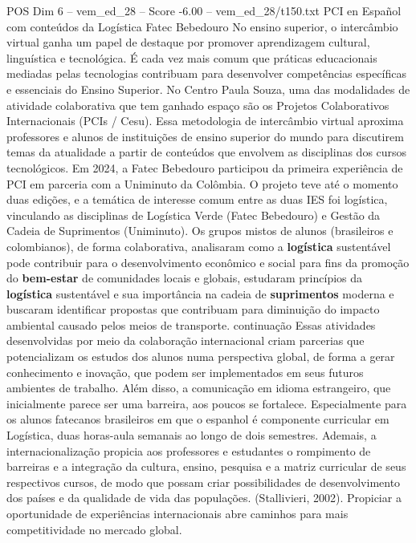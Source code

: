 \begin{textsample}{POS Dim 6 – vem\_ed\_28 – Score -6.00 – vem\_ed\_28/t150.txt}  \label{ex:f6_pos_027}
PCI en Español com conteúdos da Logística Fatec Bebedouro No ensino superior, o intercâmbio virtual ganha um papel de destaque por promover aprendizagem cultural, linguística e tecnológica.
É cada vez mais comum que práticas educacionais mediadas pelas tecnologias contribuam para desenvolver competências específicas e essenciais do Ensino Superior.
No Centro Paula Souza, uma das modalidades de atividade colaborativa que tem ganhado espaço são os Projetos Colaborativos Internacionais (PCIs / Cesu).
Essa metodologia de intercâmbio virtual aproxima professores e alunos de instituições de ensino superior do mundo para discutirem temas da atualidade a partir de conteúdos que envolvem as disciplinas dos cursos tecnológicos.
Em 2024, a Fatec Bebedouro participou da primeira experiência de PCI em parceria com a Uniminuto da Colômbia.
O projeto teve até o momento duas edições, e a temática de interesse comum entre as duas IES foi logística, vinculando as disciplinas de Logística Verde (Fatec Bebedouro) e Gestão da Cadeia de Suprimentos (Uniminuto).
Os grupos mistos de alunos (brasileiros e colombianos), de forma colaborativa, analisaram como a \textbf{logística} sustentável pode contribuir para o desenvolvimento econômico e social para fins da promoção do \textbf{bem-estar} de comunidades locais e globais, estudaram princípios da \textbf{logística} sustentável e sua importância na cadeia de \textbf{suprimentos} moderna e buscaram identificar propostas que contribuam para diminuição do impacto ambiental causado pelos meios de transporte. continuação Essas atividades desenvolvidas por meio da colaboração internacional criam parcerias que potencializam os estudos dos alunos numa perspectiva global, de forma a gerar conhecimento e inovação, que podem ser implementados em seus futuros ambientes de trabalho.
Além disso, a comunicação em idioma estrangeiro, que inicialmente parece ser uma barreira, aos poucos se fortalece.
Especialmente para os alunos fatecanos brasileiros em que o espanhol é componente curricular em Logística, duas horas-aula semanais ao longo de dois semestres.
Ademais, a internacionalização propicia aos professores e estudantes o rompimento de barreiras e a integração da cultura, ensino, pesquisa e a matriz curricular de seus respectivos cursos, de modo que possam criar possibilidades de desenvolvimento dos países e da qualidade de vida das populações. (Stallivieri, 2002).
Propiciar a oportunidade de experiências internacionais abre caminhos para mais competitividade no mercado global.

\end{textsample}
